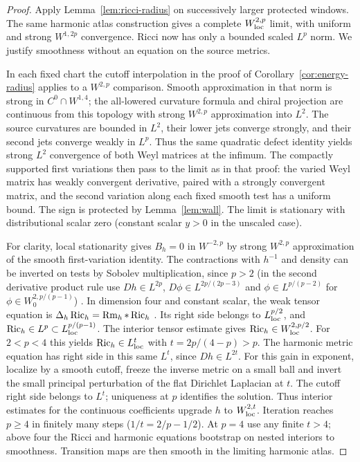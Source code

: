 \begin{proof}
Apply Lemma~\ref{lem:ricci-radius} on successively larger protected
windows. The same harmonic atlas construction gives a complete
\(W^{2,p}_{\rm loc}\) limit, with uniform and strong \(W^{1,2p}\)
convergence. Ricci now has only a bounded scaled \(L^p\) norm.
We justify smoothness without an equation on the source metrics.

In each fixed chart the cutoff interpolation in the proof of
Corollary~\ref{cor:energy-radius} applies to a \(W^{2,p}\) comparison.
Smooth approximation in that norm is strong in \(C^0\cap W^{1,4}\);
the all-lowered curvature formula and chiral projection are continuous
from this topology with strong \(W^{2,p}\) approximation into \(L^2\).
The source curvatures are bounded in \(L^2\), their lower jets converge
strongly, and their second jets converge weakly in \(L^p\). Thus the
same quadratic defect identity yields strong \(L^2\) convergence of both
Weyl matrices at the infimum. The compactly supported first variations
then pass to the limit as in that proof: the varied Weyl matrix has
weakly convergent derivative, paired with a strongly convergent matrix,
and the second variation along each fixed smooth test has a uniform
bound. The sign is protected by Lemma~\ref{lem:wall}. The limit is
stationary with distributional scalar zero (constant scalar \(y>0\)
in the unscaled case).

For clarity, local stationarity gives \(B_h=0\) in \(W^{-2,p}\)
by strong \(W^{2,p}\) approximation of the smooth first-variation
identity. The contractions with \(h^{-1}\) and density can be
inverted on tests by Sobolev multiplication, since \(p>2\)
(in the second derivative product rule use \(Dh\in L^{2p}\), \(D\phi\in L^{2p/(2p-3)}\) and \(\phi\in L^{p/(p-2)}\) for \(\phi\in W^{2,p/(p-1)}_0\)) \cite[Lemma 2.1 and proof of Theorem 1.1]{AvalosCogoRoyoAbrego2026Bach}.
In dimension four and constant scalar, the weak tensor equation is
\(\Delta_h\operatorname{Ric}_h=\operatorname{Rm}_h*\operatorname{Ric}_h\)
\cite[Lemma 5.1]{AvalosCogoRoyoAbrego2026Bach}. Its right side
belongs to \(L^{p/2}_{\rm loc}\), and \(\operatorname{Ric}_h\in L^p\subset
L^{p/(p-1)}_{\rm loc}\). The interior tensor estimate
\cite[Theorem 2.2(ii)]{AvalosCogoRoyoAbrego2026Bach} gives
\(\operatorname{Ric}_h\in W^{2,p/2}_{\rm loc}\). For \(2<p<4\) this yields
\(\operatorname{Ric}_h\in L^t_{\rm loc}\) with \(t=2p/(4-p)>p\).
The harmonic metric equation has right side in this same \(L^t\),
since \(Dh\in L^{2t}\). For this gain in exponent, localize by a smooth cutoff, freeze the inverse metric on a small ball and invert the small principal perturbation of the flat Dirichlet Laplacian at \(t\). The cutoff right side belongs to \(L^t\); uniqueness at \(p\) identifies the solution. Thus interior estimates for the
continuous coefficients upgrade \(h\) to \(W^{2,t}_{\rm loc}\).
Iteration reaches \(p\ge4\) in finitely many steps
(\(1/t=2/p-1/2\)). At \(p=4\) use any finite \(t>4\);
above four the Ricci and harmonic equations bootstrap on nested
interiors to smoothness. Transition maps are then smooth in the
limiting harmonic atlas.


\end{proof}
